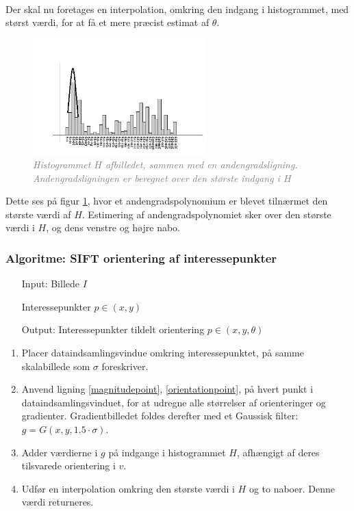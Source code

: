 \\
Der skal nu foretages en interpolation, omkring den indgang i histogrammet, med størst værdi, for at få et mere præcist estimat af $\theta$.
\begin{figure}[H]
    \centering
    \includegraphics[width=0.60\textwidth]{fig/sift-orientation-histogram.jpg}
     \vspace{-1em}
    \begin{center}    
       \caption{\textcolor{gray}{\footnotesize \textit{Histogrammet $H$ afbilledet, sammen med en andengradsligning. Andengradsligningen er beregnet over den største indgang i $H$}}}
    \label{histogramheight}
     \end{center}
     \vspace{-2.5em}
  \end{figure} \noindent
Dette ses på figur \ref{histogramheight}, hvor et andengradspolynomium er blevet tilnærmet den største værdi af $H$. Estimering af andengradspolynomiet sker over den største værdi i $H$, og dens venstre og højre nabo.


\subsubsection*{Algoritme: SIFT orientering af interessepunkter}
\begin{enumerate}
\item[Input:] Billede $I$
\item[] Interessepunkter $p  \in (x, y)$
\item[Output:]  Interessepunkter tildelt orientering $p \in (x,y, \theta)$
\end{enumerate}

\begin{enumerate}
\item Placer dataindsamlingsvindue omkring  interessepunktet, på samme skalabillede som $\sigma$ foreskriver.
\item Anvend ligning \eqref{magnitudepoint}, \eqref{orientationpoint}, på hvert punkt i dataindsamlingsvinduet, for at udregne alle størrelser af orienteringer og gradienter. Gradientbilledet foldes derefter med et Gaussisk filter: $g = G(x,y,1.5 \cdot \sigma)$.
\item Adder værdierne i $g$ på indgange i histogrammet $H$, afhængigt af deres tilsvarede orientering i $v$.
\item  Udfør en interpolation omkring den største værdi i $H$ og to naboer. Denne værdi returneres.
\end{enumerate}
